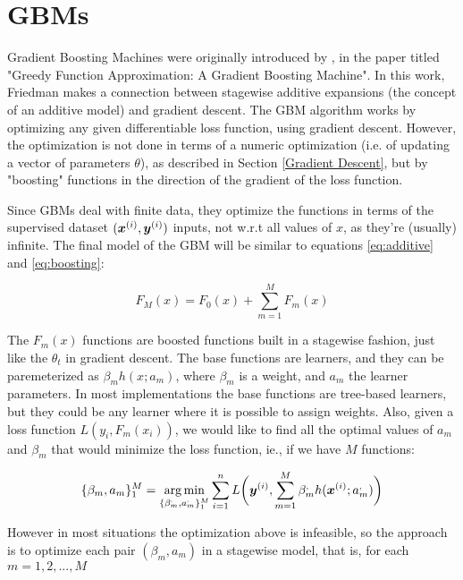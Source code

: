 \section{GBMs}

Gradient Boosting Machines were originally introduced by \cite{gbmdef}, in the paper titled "Greedy Function Approximation: A Gradient Boosting Machine". In this work, Friedman makes a connection between stagewise additive expansions (the concept of an additive model) and gradient descent. The GBM algorithm works by optimizing any given differentiable loss function, using gradient descent. However, the optimization is not done in terms of a numeric optimization (i.e. of updating a vector of parameters $\theta$), as described in Section \ref{Gradient Descent}, but by "boosting" functions in the direction of the gradient of the loss function.

Since GBMs deal with finite data, they optimize the functions in terms of the supervised dataset $(\bm{x}^{(i)},\bm{y}^{(i)})$ inputs, not w.r.t all values of $x$, as they're (usually) infinite. The final model of the GBM will be similar to equations \ref{eq:additive} and \ref{eq:boosting}:

\begin{equation}\label{eq:gbm-1}
    F_M(x) = F_0(x) + \sum_{m=1}^M F_m(x)
\end{equation}

The $F_m(x)$ functions are boosted functions built in a stagewise fashion, just like the $\theta_t$ in gradient descent. The base functions are learners, and they can be paremeterized as $\beta_mh(x;a_m)$, where $\beta_m$ is a weight, and $a_m$ the learner parameters. In most implementations the base functions are tree-based learners, but they could be any learner where it is possible to assign weights. Also, given a loss function $L(y_i, F_m(x_i))$, we would like to find all the optimal values of $a_m$ and $\beta_m$ that would minimize the loss function, ie., if we have $M$ functions:

\begin{equation*}
\{\beta_m, a_m\}_1^M = \argmin_{\{\beta_m^\apsimple, a_m^\apsimple\}_1^M} \sum_{i=1}^n L\bigg(\yisup, \sum_{m=1}^M \beta_m^\apsimple h(\xisup;a_m^\apsimple)\bigg)
\end{equation*}

However in most situations the optimization above is infeasible, so the  approach is to optimize each pair $(\beta_m, a_m)$ in a stagewise model, that is, for each $m = 1, 2, ..., M$

